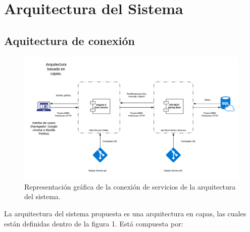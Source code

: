 \section{Arquitectura del Sistema}

\subsection{Aquitectura de conexión}


\begin{figure}[!h]
	\centering	
	\includegraphics[width=0.8\linewidth]{images/Arquitectura/Blank_Diagram2.png}
	\caption{Representación gráfica de la conexión de servicios de la arquitectura del sistema.}
\end{figure}


La arquitectura del sistema propuesta es una arquitectura en capas, las cuales están definidas dentro de la figura 1. Está compuesta por:

